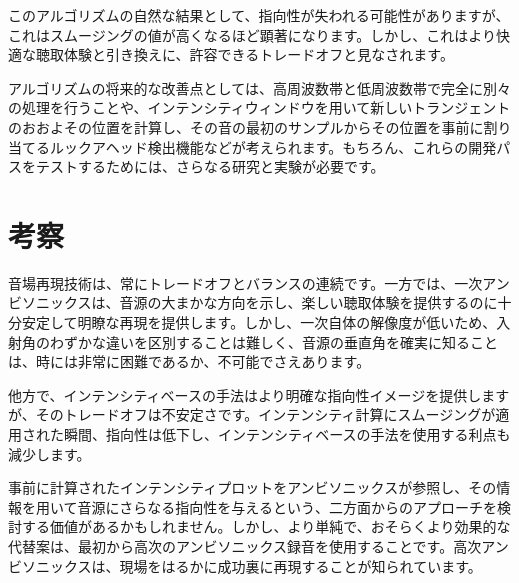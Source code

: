 \documentclass[a4paper, 12pt]{article}
\begin{document}
このアルゴリズムの自然な結果として、指向性が失われる可能性がありますが、これはスムージングの値が高くなるほど顕著になります。しかし、これはより快適な聴取体験と引き換えに、許容できるトレードオフと見なされます。

アルゴリズムの将来的な改善点としては、高周波数帯と低周波数帯で完全に別々の処理を行うことや、インテンシティウィンドウを用いて新しいトランジェントのおおよその位置を計算し、その音の最初のサンプルからその位置を事前に割り当てるルックアヘッド検出機能などが考えられます。もちろん、これらの開発パスをテストするためには、さらなる研究と実験が必要です。

\section{考察}

音場再現技術は、常にトレードオフとバランスの連続です。一方では、一次アンビソニックスは、音源の大まかな方向を示し、楽しい聴取体験を提供するのに十分安定して明瞭な再現を提供します。しかし、一次自体の解像度が低いため、入射角のわずかな違いを区別することは難しく、音源の垂直角を確実に知ることは、時には非常に困難であるか、不可能でさえあります。

他方で、インテンシティベースの手法はより明確な指向性イメージを提供しますが、そのトレードオフは不安定さです。インテンシティ計算にスムージングが適用された瞬間、指向性は低下し、インテンシティベースの手法を使用する利点も減少します。

事前に計算されたインテンシティプロットをアンビソニックスが参照し、その情報を用いて音源にさらなる指向性を与えるという、二方面からのアプローチを検討する価値があるかもしれません。しかし、より単純で、おそらくより効果的な代替案は、最初から高次のアンビソニックス録音を使用することです。高次アンビソニックスは、現場をはるかに成功裏に再現することが知られています。



\end{document}
